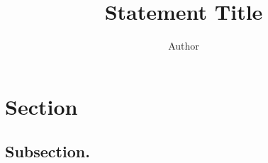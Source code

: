 \documentclass{nsf-grfp}
\title{Statement Title}
\author{Author}
\begin{document}
\maketitle

\lipsum[1-2]

\section*{Section}
\lipsum[3]

\subsection*{Subsection.}
\lipsum[4-5]



\end{document}
